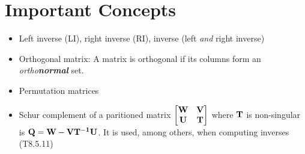 \documentclass[a4paper, oneside]{book}
\begin{document}
\section*{Important Concepts}
\begin{itemize}
\item Left inverse (LI), right inverse (RI), inverse (\aka left \textit{and} right inverse)
\item Orthogonal matrix: A matrix is orthogonal if its columns form an \textit{ortho\textbf{normal}} set.
\item Permutation matrices
\item Schur complement of a paritioned matrix $\begin{bmatrix}
\mathbf W & \mathbf V \\ \mathbf U & \mathbf T
\end{bmatrix}$ where $\mathbf T$ is non-singular is $\mathbf{Q=W-VT^{-1}U}$. It is used, among others, when computing inverses (T8.5.11)
\end{itemize}
\end{document}
